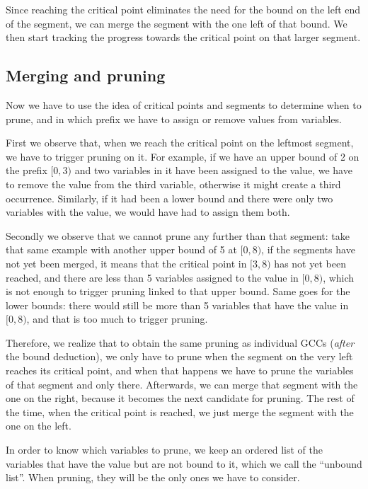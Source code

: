 \documentclass[a4paper,10pt]{article}
\begin{document}
Since reaching the critical point eliminates the need for the bound on the left end of the segment, we can merge the segment with the one left of that bound. We then start tracking the progress towards the critical point on that larger segment.

\subsection{Merging and pruning}
\label{subsec:merging-pruning}

Now we have to use the idea of critical points and segments to determine when to prune, and in which prefix we have to assign or remove values from variables.

First we observe that, when we reach the critical point on the leftmost segment, we have to trigger pruning on it. For example, if we have an upper bound of 2 on the prefix $[0,3)$ and two variables in it have been assigned to the value, we have to remove the value from the third variable, otherwise it might create a third occurrence. Similarly, if it had been a lower bound and there were only two variables with the value, we would have had to assign them both.

Secondly we observe that we cannot prune any further than that segment: take that same example with another upper bound of 5 at $[0,8)$, if the segments have not yet been merged, it means that the critical point in $[3,8)$ has not yet been reached, and there are less than 5 variables assigned to the value in $[0,8)$, which is not enough to trigger pruning linked to that upper bound. Same goes for the lower bounds: there would still be more than 5 variables that have the value in $[0,8)$, and that is too much to trigger pruning.

Therefore, we realize that to obtain the same pruning as individual GCCs (\emph{after} the bound deduction), we only have to prune when the segment on the very left reaches its critical point, and when that happens we have to prune the variables of that segment and only there. Afterwards, we can merge that segment with the one on the right, because it becomes the next candidate for pruning. The rest of the time, when the critical point is reached, we just merge the segment with the one on the left.

In order to know which variables to prune, we keep an ordered list of the variables that have the value but are not bound to it, which we call the ``unbound list''. When pruning, they will be the only ones we have to consider.
\end{document}
